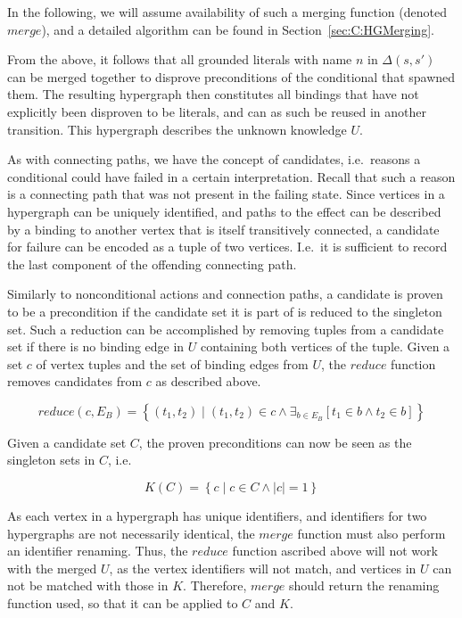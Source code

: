 \documentclass[\master/Master.tex]{subfiles}
\begin{document}
In the following, we will assume availability of such a merging function (denoted $merge$), and a detailed algorithm can be found in Section~\ref{sec:C:HGMerging}.

From the above, it follows that all grounded literals with name $n$ in $\Delta\left(s, s'\right)$ can be merged together to disprove preconditions of the conditional that spawned them. The resulting hypergraph then constitutes all bindings that have not explicitly been disproven to be literals, and can as such be reused in another transition. This hypergraph describes the unknown knowledge $U$.

As with connecting paths, we have the concept of candidates, i.e.\ reasons a conditional could have failed in a certain interpretation. Recall that such a reason is a connecting path that was not present in the failing state. Since vertices in a hypergraph can be uniquely identified, and paths to the effect can be described by a binding to another vertex that is itself transitively connected, a candidate for failure can be encoded as a tuple of two vertices. I.e.\ it is sufficient to record the last component of the offending connecting path.

Similarly to nonconditional actions and connection paths, a candidate is proven to be a precondition if the candidate set it is part of is reduced to the singleton set. Such a reduction can be accomplished by removing tuples from a candidate set if there is no binding edge in $U$ containing both vertices of the tuple. Given a set $c$ of vertex tuples and the set of binding edges from $U$, the $reduce$ function removes candidates from $c$ as described above.

\begin{equation*}
    reduce(c, E_B) =
    \left\{ \left( t_1, t_2 \right) \mid 
        \left( t_1, t_2 \right) \in c \land 
        \exists_{b \in E_B} \left[ t_1 \in b \land t_2 \in b \right] 
    \right\}
\end{equation*}

Given a candidate set $C$, the proven preconditions can now be seen as the singleton sets in $C$, i.e.\ 

\begin{equation*}
    K(C) = \left\{ 
        c \mid c \in C \land |c| = 1
    \right\}
\end{equation*}

As each vertex in a hypergraph has unique identifiers, and identifiers for two hypergraphs are not necessarily identical, the $merge$ function must also perform an identifier renaming. Thus, the $reduce$ function ascribed above will not work with the merged $U$, as the vertex identifiers will not match, and vertices in $U$ can not be matched with those in $K$. Therefore, $merge$ should return the renaming function used, so that it can be applied to $C$ and $K$.
\end{document}
